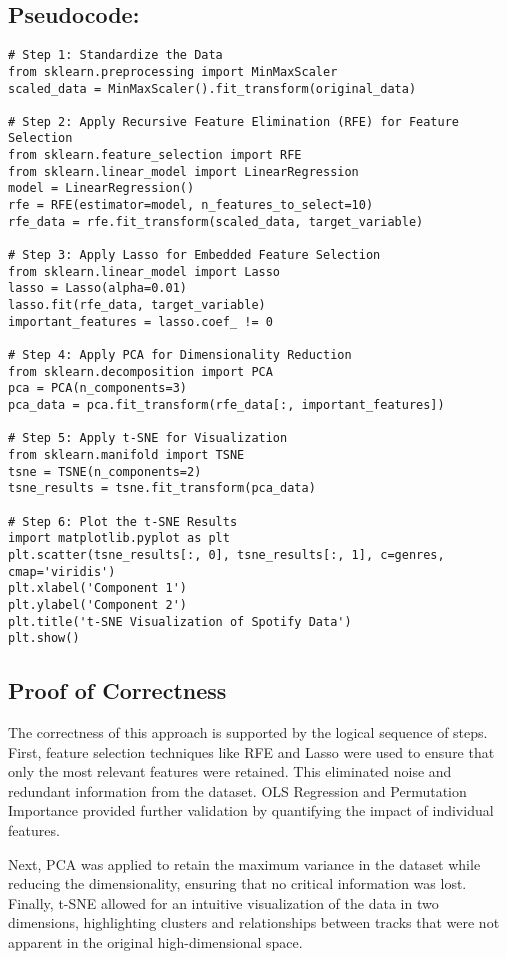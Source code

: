 \documentclass{article}
\begin{document}
\subsection{Pseudocode:}
\begin{verbatim}
# Step 1: Standardize the Data
from sklearn.preprocessing import MinMaxScaler
scaled_data = MinMaxScaler().fit_transform(original_data)

# Step 2: Apply Recursive Feature Elimination (RFE) for Feature Selection
from sklearn.feature_selection import RFE
from sklearn.linear_model import LinearRegression
model = LinearRegression()
rfe = RFE(estimator=model, n_features_to_select=10)
rfe_data = rfe.fit_transform(scaled_data, target_variable)

# Step 3: Apply Lasso for Embedded Feature Selection
from sklearn.linear_model import Lasso
lasso = Lasso(alpha=0.01)
lasso.fit(rfe_data, target_variable)
important_features = lasso.coef_ != 0

# Step 4: Apply PCA for Dimensionality Reduction
from sklearn.decomposition import PCA
pca = PCA(n_components=3)
pca_data = pca.fit_transform(rfe_data[:, important_features])

# Step 5: Apply t-SNE for Visualization
from sklearn.manifold import TSNE
tsne = TSNE(n_components=2)
tsne_results = tsne.fit_transform(pca_data)

# Step 6: Plot the t-SNE Results
import matplotlib.pyplot as plt
plt.scatter(tsne_results[:, 0], tsne_results[:, 1], c=genres, cmap='viridis')
plt.xlabel('Component 1')
plt.ylabel('Component 2')
plt.title('t-SNE Visualization of Spotify Data')
plt.show()
\end{verbatim}

\subsection{Proof of Correctness}

The correctness of this approach is supported by the logical sequence of steps. First, feature selection techniques like RFE and Lasso were used to ensure that only the most relevant features were retained. This eliminated noise and redundant information from the dataset. OLS Regression and Permutation Importance provided further validation by quantifying the impact of individual features. 

Next, PCA was applied to retain the maximum variance in the dataset while reducing the dimensionality, ensuring that no critical information was lost. Finally, t-SNE allowed for an intuitive visualization of the data in two dimensions, highlighting clusters and relationships between tracks that were not apparent in the original high-dimensional space.
\end{document}
